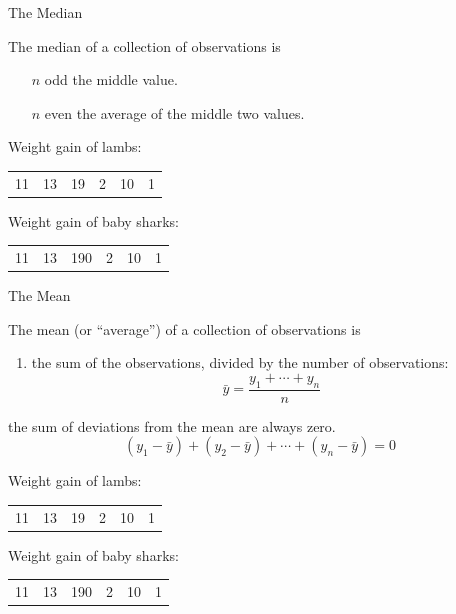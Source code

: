 \begin{frame}{The Median}

    The \alert{median} of a collection of observations
    is
    \begin{enumerate}
        \item[$n$ odd] the middle value.
        \item[$n$ even] the average of the middle two values.
    \end{enumerate}


     Weight gain of lambs:
    \begin{center}
        \begin{tabular}{cccccc}
            11 & 13 & 19 & 2 & 10 & 1
        \end{tabular}
    \end{center}

    \pause

     Weight gain of baby sharks:
    \begin{center}
        \begin{tabular}{cccccc}
            11 & 13 & 190 & 2 & 10 & 1
        \end{tabular}
    \end{center}

\end{frame}


\begin{frame}{The Mean}

    The \alert{mean} (or ``average'') of a collection of observations is
    \begin{enumerate}
        \item the sum of the observations, divided by the number of observations:
            \[
                \bar y = \frac{ y_1 + \cdots + y_n }{ n  }
            \]
    \end{enumerate}

    \pause

     the sum of deviations from the mean are always zero.
    \[
        (y_1 - \bar y) + (y_2 - \bar y) + \cdots + (y_n - \bar y) = 0
    \]

    \pause

     Weight gain of lambs:
    \begin{center}
        \begin{tabular}{cccccc}
            11 & 13 & 19 & 2 & 10 & 1
        \end{tabular}
    \end{center}

    \pause

     Weight gain of baby sharks:
    \begin{center}
        \begin{tabular}{cccccc}
            11 & 13 & 190 & 2 & 10 & 1
        \end{tabular}
    \end{center}

\end{frame}


